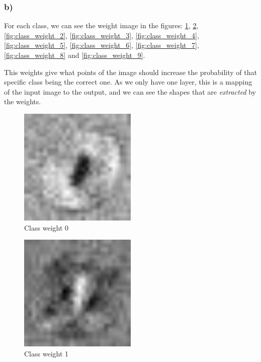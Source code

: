 \subsubsection*{b)}
For each class, we can see the weight image in the figures: \cref{fig:class_weight_0}, \cref{fig:class_weight_1}, \cref{fig:class_weight_2}, \cref{fig:class_weight_3}, \cref{fig:class_weight_4}, \cref{fig:class_weight_5}, \cref{fig:class_weight_6}, \cref{fig:class_weight_7}, \cref{fig:class_weight_8} and \cref{fig:class_weight_9}.  

This weights give what points of the image should increase the probability of that specific class being the correct one. As we only have one layer, this is a mapping of the input image to the output, and we can see the shapes that are \textit{extracted} by the weights. 

\begin{figure}[]
    \centering
    \includegraphics[width=0.50\textwidth]{figures/weights/class_0_weight_image.jpg}
    \caption{Class weight 0}
    \label{fig:class_weight_0}
\end{figure}

\begin{figure}[]
    \centering
    \includegraphics[width=0.50\textwidth]{figures/weights/class_1_weight_image.jpg}
    \caption{Class weight 1}
    \label{fig:class_weight_1}
\end{figure}

